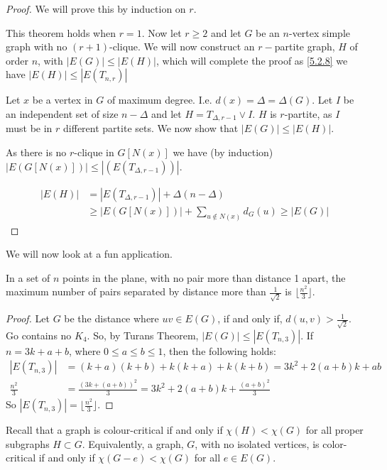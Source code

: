 \begin{proof}
	We will prove this by induction on $r$.

	This theorem holds when $r = 1$. Now let $r \ge 2$ and let $G$ be an $n$-vertex simple graph with no $(r+1)$-clique. We will now construct an $r-$partite graph, $H$ of order $n$, with $|E(G)| \le |E(H)|$, which will complete the proof as \autoref{5.2.8} we have $|E(H)| \le |E(T_{n,r})|$

	Let $x$ be a vertex in $G$ of maximum degree. I.e. $d(x) = \Delta = \Delta(G)$. Let $I$ be an independent set of size $n-\Delta$ and let $H = T_{\Delta,r-1} \lor I$. $H$ is $r$-partite, as $I$ must be in $r$ different partite sets. We now show that $|E(G)| \le |E(H)|$.

	As there is no $r$-clique in $G[N(x)]$ we have (by induction) $|E(G[N(x)])|  \le |(E(T_{\Delta, r-1}))|$.

	\begin{align*}
		|E(H)| & = |E(T_{\Delta, r-1})| + \Delta(n-\Delta)                   \\
		       & \ge |E(G[N(x)])| + \sum_{u \notin N(x)} d_{G}(u) \ge |E(G)|
	\end{align*}
\end{proof}

We will now look at a fun application.

In a set of $n$ points in the plane, with no pair more than distance 1 apart, the maximum number of pairs separated by distance more than $\frac{1}{\sqrt{2}}$ is $\lfloor \frac{n^{2}}{3}\rfloor$.

\begin{proof}
	Let $G$ be the distance where $uv \in E(G)$, if and only if, $d(u,v) > \frac{1}{\sqrt{2}}$. Go contains no $K_{4}$. So, by Turans Theorem, $|E(G)| \le |E(T_{n,3})|$. If $n = 3k+a+b$, where $0 \le a \le b\le 1$, then the following holds:
	\begin{align*}
		|E(T_{n,3})|    & = (k+a)(k+b)+k(k+a)+k(k+b)=3k^{2}+2(a+b)k+ab                    \\
		\frac{n^{2}}{3} & = \frac{(3k+(a+b))^{2}}{3} = 3k^{2}+2(a+b)k+\frac{(a+b)^{2}}{3}
	\end{align*}
	So $|E(T_{n,3})| = \lfloor \frac{n^{2}}{3} \rfloor$.
\end{proof}

Recall that a graph is colour-critical if and only if \(\chi(H) < \chi(G)\) for all proper subgraphs $H \subset G$. Equivalently, a graph, $G$, with no isolated vertices, is color-critical if and only if \(\chi(G-e) < \chi(G)\) for all $e \in E(G)$.

